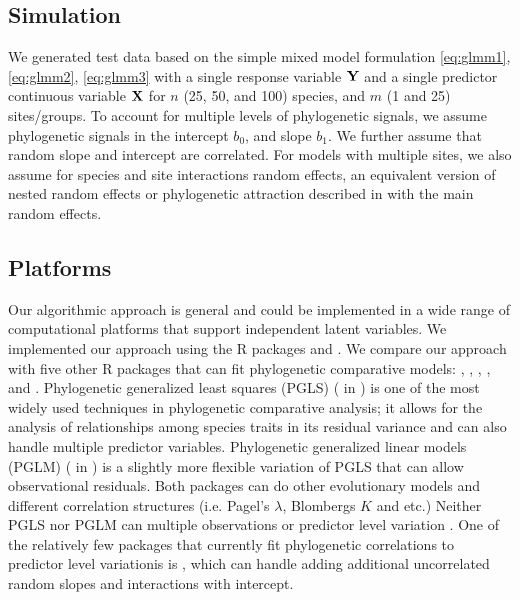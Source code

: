 \subsection{Simulation}

We generated test data based on the simple mixed model formulation \ref{eq:glmm1}, \ref{eq:glmm2}, \ref{eq:glmm3} with a single response variable ${\mathbf Y}$ and a single predictor continuous variable ${\mathbf X}$ for $n$ (25, 50, and 100) species, and $m$ (1 and 25) sites/groups. 
To account for multiple levels of phylogenetic signals, we assume phylogenetic signals in the intercept $b_0$, and slope $b_1$. 
We further assume that random slope and intercept are correlated. 
For models with multiple sites, we also assume for species and site interactions random effects, an equivalent version of nested random effects or phylogenetic attraction described in \cite{helmus2007separating} with the main random effects.

\subsection{Platforms}

Our algorithmic approach is general and could be implemented in a wide range of computational platforms that support independent latent variables. We implemented our approach using the R packages  \citep{bates2015fitting} and  .
We compare our approach with five other R packages that can fit phylogenetic comparative models:  \citep{pinheiro2014r},  \citep{ho2014phylolm},  \citep{pearse2015pez},  \cite{hadfield2010mcmc}, and  \citep{burkner2016brms}.
Phylogenetic generalized least squares (PGLS) ( in ) is one of the most widely used techniques in phylogenetic comparative analysis; it allows for the analysis of relationships among species traits in its residual variance and can also handle multiple predictor variables.
Phylogenetic generalized linear models (PGLM) ( in ) is a slightly more flexible variation of PGLS that can allow observational residuals.
Both packages can do other evolutionary models and different correlation structures (i.e. Pagel's $\lambda$, Blombergs $K$ and etc.)
Neither PGLS nor PGLM can multiple observations or predictor level variation . 
One of the relatively few packages that currently fit phylogenetic correlations to predictor level variationis is , which can handle adding additional uncorrelated random slopes and interactions with intercept.

